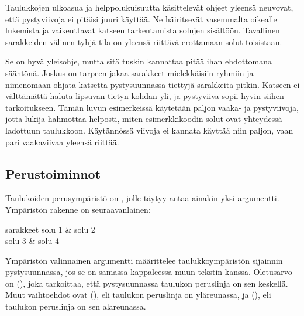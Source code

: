 Taulukkojen ulkoasua ja helppolukuisuutta käsittelevät ohjeet yleensä
neuvovat, että pystyviivoja ei pitäisi juuri käyttää. Ne häiritsevät
vasemmalta oikealle lukemista ja vaikeuttavat katseen tarkentamista
solujen sisältöön. Tavallinen sarakkeiden välinen tyhjä tila on yleensä
riittävä erottamaan solut toisistaan.

Se on hyvä yleisohje, mutta sitä tuskin kannattaa pitää ihan ehdottomana
sääntönä. Joskus on tarpeen jakaa sarakkeet mielekkäisiin ryhmiin ja
nimenomaan ohjata katsetta pystysuunnassa tiettyjä sarakkeita pitkin.
Katseen ei välttämättä haluta lipsuvan tietyn kohdan yli, ja pystyviiva
sopii hyvin siihen tarkoitukseen. Tämän luvun esimerkeissä käytetään
paljon vaaka- ja pystyviivoja, jotta lukija hahmottaa helposti, miten
esimerkkikoodin solut ovat yhteydessä ladottuun taulukkoon. Käytännössä
viivoja ei kannata käyttää niin paljon, vaan pari vaakaviivaa yleensä
riittää.

\subsection{Perustoiminnot}

Taulukoiden perusympäristö on , jolle täytyy antaa
ainakin yksi argumentti. Ympäristön rakenne on seuraavanlainen:

\komentoi{\keno}
\begin{koodilohkosis}
\begin{tabular}[sijainti]{sarakkeet}
  solu 1 & solu 2 \\
  solu 3 & solu 4 \\
\end{tabular}
\end{koodilohkosis}

\noindent
Ympäristön valinnainen argumentti  määrittelee
taulukkoympäristön sijainnin pystysuunnassa, jos se on samassa
kappaleessa muun tekstin kanssa. Oletusarvo on 
(), joka tarkoittaa, että pystysuunnassa taulukon
peruslinja on sen keskellä. Muut vaihtoehdot ovat 
(), eli taulukon peruslinja on yläreunassa, ja 
(), eli taulukon peruslinja on sen alareunassa.


